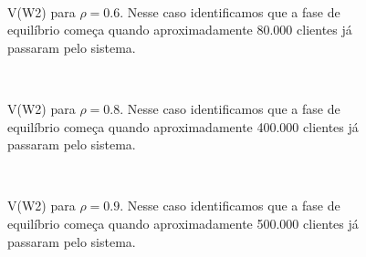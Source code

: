 \begin{figure}[htb!]
   \\
   \caption{V(W2) para $\rho=0.6$. Nesse caso identificamos que a fase de equilíbrio começa quando aproximadamente 80.000 clientes já passaram pelo sistema.}
\end{figure}

\begin{figure}[htb!]
   \\
   \caption{V(W2) para $\rho=0.8$. Nesse caso identificamos que a fase de equilíbrio começa quando aproximadamente 400.000 clientes já passaram pelo sistema.}
\end{figure}

\begin{figure}[htb!]
   \\
   \caption{V(W2) para $\rho=0.9$. Nesse caso identificamos que a fase de equilíbrio começa quando aproximadamente 500.000 clientes já passaram pelo sistema.}
\end{figure}